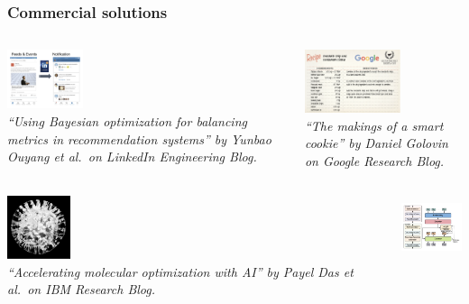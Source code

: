 \documentclass[aspectratio=169]{beamer}
\begin{document}
\begin{frame}\frametitle{Commercial solutions}
\begin{columns}
\pause
\begin{column}{0.5\textwidth}
\begin{center}
\includegraphics[width=6em]{../img/probs/linkedin-notifications.png}\\
{\tiny \sl
``Using Bayesian optimization for balancing metrics in recommendation systems''
by Yunbao Ouyang et al.\ on LinkedIn Engineering Blog.\\
}
\end{center}
\end{column}
\pause
\begin{column}{0.5\textwidth}
\begin{center}
\includegraphics[height=5em]{../img/probs/google-cookies.png}\\
{\tiny \sl
``The makings of a smart cookie''
by Daniel Golovin on Google Research Blog.\\
}
\end{center}
\end{column}
\end{columns}
\begin{columns}
\pause
\begin{column}{0.33\textwidth}
\begin{center}
\includegraphics[width=5em]{../img/probs/ibm-sdl.png}\\
{\tiny \sl
``Accelerating molecular optimization with AI'' by Payel Das et al.\
on IBM Research Blog.\\
}
\end{center}
\end{column}
\pause
\begin{column}{0.33\textwidth}
\begin{center}
\includegraphics[height=5em]{../img/probs/meta-nas.png}\\

\end{center}
\end{column}
\end{columns}
\end{frame}
\end{document}

